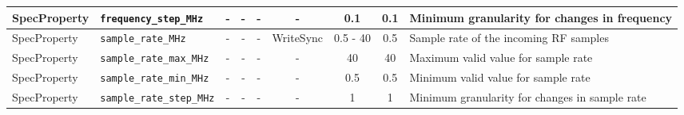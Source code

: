 \documentclass{article}
\begin{document}
\begin{landscape}
\begin{scriptsize}
\begin{tabular}{|p{2cm}|p{4cm}|c|c|c|c|c|c|p{6.5cm}|}
			\hline
			SpecProperty & \verb+frequency_step_MHz+           & -    & -        & -          & -              & 0.1          & 0.1     & Minimum granularity for changes in frequency                                                                                                                                                                                \\
			\hline
			SpecProperty & \verb+sample_rate_MHz+              & -    & -        & -          & WriteSync      & 0.5 - 40     & 0.5     & Sample rate of the incoming RF samples                                                                                                                                                                                      \\
			\hline
			SpecProperty & \verb+sample_rate_max_MHz+          & -    & -        & -          & -              & 40           & 40      & Maximum valid value for sample rate                                                                                                                                                                                         \\
			\hline
			SpecProperty & \verb+sample_rate_min_MHz+          & -    & -        & -          & -              & 0.5          & 0.5     & Minimum valid value for sample rate                                                                                                                                                                                         \\
			\hline
			SpecProperty & \verb+sample_rate_step_MHz+         & -    & -        & -          & -              & 1            & 1       & Minimum granularity for changes in sample rate                                                                                                                                                                              \\
			\hline




\end{tabular}
\end{scriptsize}
\end{landscape}
\end{document}
